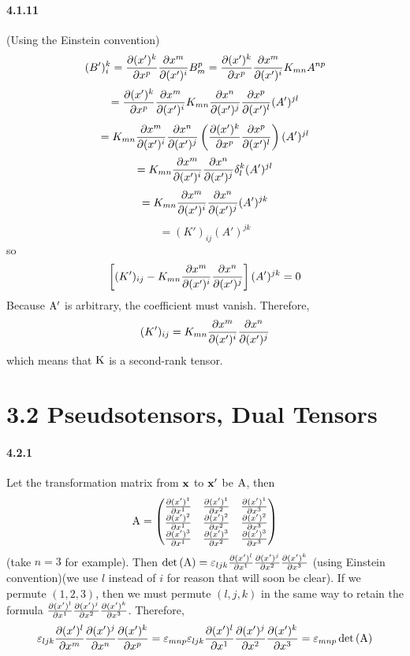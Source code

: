 \documentclass[a4paper]{article}
\begin{document}
\paragraph{4.1.11}
(Using the Einstein convention)
\[
(B')^k_i=\frac{\partial(x')^k}{\partial x^p}\frac{\partial x^m}{\partial(x')^i}B^p_m
=\frac{\partial(x')^k}{\partial x^p}\frac{\partial x^m}{\partial(x')^i}K_{mn}A^{np}
\]
\[
=\frac{\partial(x')^k}{\partial x^p}\frac{\partial x^m}{\partial(x')^i}K_{mn}\frac{\partial x^n}{\partial(x')^j}\frac{\partial x^p}{\partial(x')^l}(A')^{jl}
\]
\[
=K_{mn}\frac{\partial x^m}{\partial(x')^i}\frac{\partial x^n}{\partial(x')^j}\left(\frac{\partial(x')^k}{\partial x^p}\frac{\partial x^p}{\partial(x')^l} \right)(A')^{jl}
\]
\[
=K_{mn}\frac{\partial x^m}{\partial(x')^i}\frac{\partial x^n}{\partial(x')^j}\delta^k_l(A')^{jl}
\]
\[
=K_{mn}\frac{\partial x^m}{\partial(x')^i}\frac{\partial x^n}{\partial(x')^j}(A')^{jk}
\]
\[
=(K')_{ij}(A')^{jk}
\]
so
\[
\left[(K')_{ij}-K_{mn}\frac{\partial x^m}{\partial(x')^i}\frac{\partial x^n}{\partial(x')^j} \right](A')^{jk}=0
\]
Because $\mathrm{A'}$ is arbitrary, the coefficient must vanish. Therefore,
\[
(K')_{ij}=K_{mn}\frac{\partial x^m}{\partial(x')^i}\frac{\partial x^n}{\partial(x')^j}
\]
which means that $\mathrm{K}$ is a second-rank tensor.

\section*{3.2 Pseudsotensors, Dual Tensors}

\renewcommand{\arraystretch}{1.5}

\paragraph{4.2.1}
Let the transformation matrix from $\mathbf{x}$ to $\mathbf{x'}$ be $\mathrm{A}$, then
\[
\mathrm{A}=
\begin{pmatrix}
\frac{\partial(x')^1}{\partial x^1}&\frac{\partial(x')^1}{\partial x^2}&\frac{\partial(x')^1}{\partial x^3}\\
\frac{\partial(x')^2}{\partial x^1}&\frac{\partial(x')^2}{\partial x^2}&\frac{\partial(x')^2}{\partial x^3}\\
\frac{\partial(x')^3}{\partial x^1}&\frac{\partial(x')^3}{\partial x^2}&\frac{\partial(x')^3}{\partial x^3}\\
\end{pmatrix}
\]
(take $n=3$ for example). Then $\det{(\mathrm{A})}=\varepsilon_{ljk}\frac{\partial(x')^l}{\partial x^1}\frac{\partial(x')^j}{\partial x^2}\frac{\partial(x')^k}{\partial x^3}$ (using Einstein convention)(we use $l$ instead of $i$ for reason that will soon be clear). If we permute $(1,2,3)$, then we must permute $(l,j,k)$ in the same way to retain the formula $\frac{\partial(x')^l}{\partial x^1}\frac{\partial(x')^j}{\partial x^2}\frac{\partial(x')^k}{\partial x^3}$. Therefore, 
\begin{equation}
    \varepsilon_{ljk}\frac{\partial(x')^l}{\partial x^m}\frac{\partial(x')^j}{\partial x^n}\frac{\partial(x')^k}{\partial x^p}=\varepsilon_{mnp}\varepsilon_{ljk}\frac{\partial(x')^l}{\partial x^1}\frac{\partial(x')^j}{\partial x^2}\frac{\partial(x')^k}{\partial x^3}=\varepsilon_{mnp}\det{(\mathrm{A})}
\end{equation}
\end{document}
